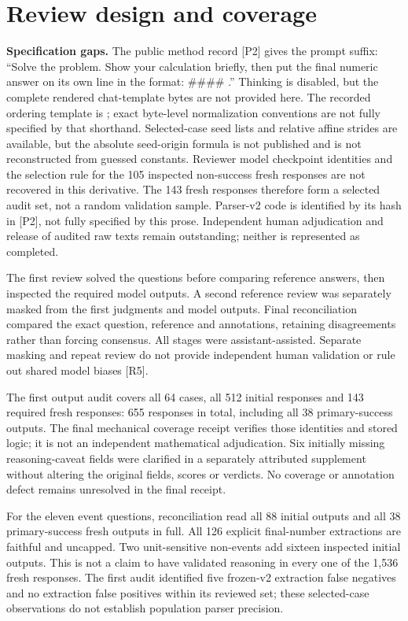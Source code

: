 \documentclass[11pt,a4paper]{article}
\DeclareRobustCommand{\longtok}[1]{\texttt{\seqsplit{#1}}}
\begin{document}
\section{Review design and coverage}\label{review-design-and-coverage}

\textbf{Specification gaps.} The public method record {[}P2{]} gives the
prompt suffix: ``Solve the problem. Show your calculation briefly, then
put the final numeric answer on its own line in the format: \#\#\#\# .''
Thinking is disabled, but the complete rendered chat-template bytes are
not provided here. The recorded ordering template is
\longtok{seed:order:question\_digest}; exact byte-level normalization
conventions are not fully specified by that shorthand. Selected-case
seed lists and relative affine strides are available, but the absolute
seed-origin formula is not published and is not reconstructed from
guessed constants. Reviewer model checkpoint identities and the
selection rule for the 105 inspected non-success fresh responses are not
recovered in this derivative. The 143 fresh responses therefore form a
selected audit set, not a random validation sample. Parser-v2 code is
identified by its hash in {[}P2{]}, not fully specified by this prose.
Independent human adjudication and release of audited raw texts remain
outstanding; neither is represented as completed.

The first review solved the questions before comparing reference
answers, then inspected the required model outputs. A second reference
review was separately masked from the first judgments and model outputs.
Final reconciliation compared the exact question, reference and
annotations, retaining disagreements rather than forcing consensus. All
stages were assistant-assisted. Separate masking and repeat review do
not provide independent human validation or rule out shared model biases
{[}R5{]}.

The first output audit covers all 64 cases, all 512 initial responses
and 143 required fresh responses: 655 responses in total, including all
38 primary-success outputs. The final mechanical coverage receipt
verifies those identities and stored logic; it is not an independent
mathematical adjudication. Six initially missing reasoning-caveat fields
were clarified in a separately attributed supplement without altering
the original fields, scores or verdicts. No coverage or annotation
defect remains unresolved in the final receipt.

For the eleven event questions, reconciliation read all 88 initial
outputs and all 38 primary-success fresh outputs in full. All 126
explicit final-number extractions are faithful and uncapped. Two
unit-sensitive non-events add sixteen inspected initial outputs. This is
not a claim to have validated reasoning in every one of the 1,536 fresh
responses. The first audit identified five frozen-v2 extraction false
negatives and no extraction false positives within its reviewed set;
these selected-case observations do not establish population parser
precision.
\end{document}
